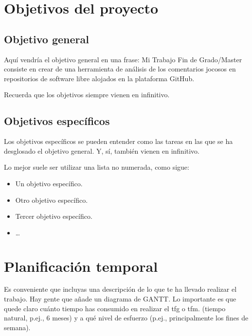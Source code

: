 \section{Objetivos del proyecto}
\label{sec:objetivos}

\subsection{Objetivo general} %
\label{sec:objetivo-general} %


Aquí vendría el objetivo general en una frase:
Mi Trabajo Fin de Grado/Master consiste en crear de una herramienta de análisis de los comentarios jocosos en repositorios de software libre alojados en la plataforma GitHub.

Recuerda que los objetivos siempre vienen en infinitivo.


\subsection{Objetivos específicos}
\label{sec:objetivos-especificos}

Los objetivos específicos se pueden entender como las tareas en las que se ha desglosado el objetivo general. Y, sí, también vienen en infinitivo.

Lo mejor suele ser utilizar una lista no numerada, como sigue:

\begin{itemize}
    \item Un objetivo específico.
    \item Otro objetivo específico.
    \item Tercer objetivo específico.
    \item \ldots
\end{itemize}

\section{Planificación temporal}
\label{sec:planificacion-temporal}

Es conveniente que incluyas una descripción de lo que te ha llevado realizar el trabajo.
Hay gente que añade un diagrama de GANTT.
Lo importante es que quede claro cuánto tiempo has consumido en realizar el \acrfull{tfg} o \acrfull{tfm}. 
(tiempo natural, p.ej., 6 meses) y a qué nivel de esfuerzo (p.ej., principalmente los 
fines de semana).


